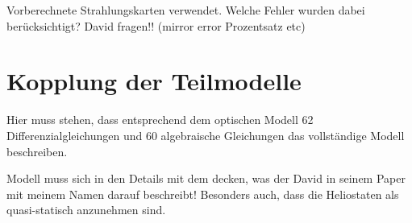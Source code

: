 Vorberechnete Strahlungskarten verwendet.
Welche Fehler wurden dabei berücksichtigt? David fragen!! (mirror error Prozentsatz etc)


\section{Kopplung der Teilmodelle} \label{sec_KopplungModelle}
Hier muss stehen, dass entsprechend dem optischen Modell 62 Differenzialgleichungen und 60 algebraische Gleichungen das vollständige Modell beschreiben.

Modell muss sich in den Details mit dem decken, was der David in seinem Paper mit meinem Namen darauf beschreibt!
Besonders auch, dass die Heliostaten als quasi-statisch anzunehmen sind.
